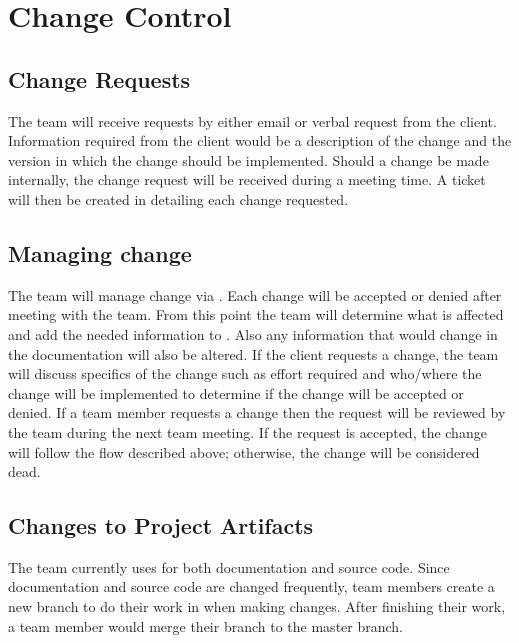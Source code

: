 \section{Change Control}
\subsection{Change Requests}
The team will receive requests by either email or verbal request from the client.  Information required from the client would be a description of the change and the version in which the change should be implemented.  Should a change be made internally, the change request will be received during a meeting time. A ticket will then be created in  detailing each change requested.

\subsection{Managing change}
The team will manage change via . Each change will be accepted or denied after meeting with the team. From this point the team will determine what is affected and add the needed information to . Also any information that would change in the documentation will also be altered. If the client requests a change, the team will discuss specifics of the change such as effort required and who/where the change will be implemented to determine if the change will be accepted or denied. If a team member requests a change then the request will be reviewed by the team during the next team meeting.  If the request is accepted, the change will follow the flow described above; otherwise, the change will be considered dead.

\subsection{Changes to Project Artifacts}
The team currently uses  for both documentation and source code.  Since documentation and source code are changed frequently, team members create a new branch to do their work in when making changes.  After finishing their work, a team member would merge their branch to the master branch.
